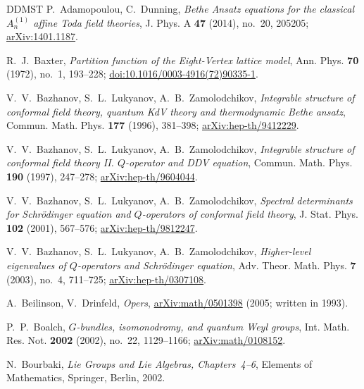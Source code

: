 \documentclass[11pt,leqno]{amsart}
\numberwithin{equation}{section}
\theoremstyle{plain}
\theoremstyle{definition}
\theoremstyle{plain}
\theoremstyle{definition}
\theoremstyle{remark}
\begin{document}
\begin{thebibliography}{DDMST}
\small
\setlength{\itemsep}{0.05em}
P.~Adamopoulou, C.~Dunning,
\emph{Bethe Ansatz equations for the classical $A_n^{(1)}$ affine Toda field theories},
J. Phys. A \textbf{47} (2014), no.~20, 205205; \href{https://arxiv.org/abs/1401.1187}{arXiv:1401.1187}.

R.~J.~Baxter,
\emph{Partition function of the Eight-Vertex lattice model},
Ann. Phys. \textbf{70} (1972), no.~1, 193--228; \href{https://doi.org/10.1016/0003-4916(72)90335-1}{doi:10.1016/0003-4916(72)90335-1}.

V.~V.~Bazhanov, S.~L.~Lukyanov, A.~B.~Zamolodchikov,
\emph{Integrable structure of conformal field theory, quantum KdV theory and thermodynamic Bethe ansatz},
Commun. Math. Phys. \textbf{177} (1996), 381--398; \href{https://arxiv.org/abs/hep-th/9412229}{arXiv:hep-th/9412229}.

V.~V.~Bazhanov, S.~L.~Lukyanov, A.~B.~Zamolodchikov,
\emph{Integrable structure of conformal field theory II. $Q$-operator and DDV equation},
Commun. Math. Phys. \textbf{190} (1997), 247--278; \href{https://arxiv.org/abs/hep-th/9604044}{arXiv:hep-th/9604044}.

V.~V.~Bazhanov, S.~L.~Lukyanov, A.~B.~Zamolodchikov,
\emph{Spectral determinants for Schr\"odinger equation and $Q$-operators of conformal field theory},
J. Stat. Phys. \textbf{102} (2001), 567--576; \href{https://arxiv.org/abs/hep-th/9812247}{arXiv:hep-th/9812247}.

V.~V.~Bazhanov, S.~L.~Lukyanov, A.~B.~Zamolodchikov,
\emph{Higher-level eigenvalues of $Q$-operators and Schr\"odinger equation},
Adv. Theor. Math. Phys. \textbf{7} (2003), no.~4, 711--725; \href{https://arxiv.org/abs/hep-th/0307108}{arXiv:hep-th/0307108}.

A.~Beilinson, V.~Drinfeld,
\emph{Opers},
\href{https://arxiv.org/abs/math/0501398}{arXiv:math/0501398} (2005; written in 1993).

P.~P.~Boalch,
\emph{$G$-bundles, isomonodromy, and quantum Weyl groups},
Int. Math. Res. Not. \textbf{2002} (2002), no.~22, 1129--1166; \href{https://arxiv.org/abs/math/0108152}{arXiv:math/0108152}.

N.~Bourbaki,
\emph{Lie Groups and Lie Algebras, Chapters~4--6},
Elements of Mathematics, Springer, Berlin, 2002.


\end{thebibliography}
\end{document}
